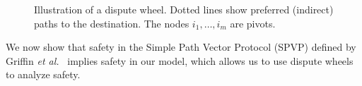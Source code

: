 \begin{figure}
\centering
\begin{psfrags}
%
%
\end{psfrags}
\caption[Illustration of a dispute wheel.]{Illustration of a dispute
  wheel.  Dotted lines show preferred 
  (indirect) paths to the destination.  The nodes $i_1, \ldots, i_m$
  are pivots.}
\label{fig:dw}
\end{figure}



We now show
  that safety in the Simple 
Path Vector Protocol (SPVP) defined by Griffin {\em et
al.}~\cite{Griffin2002c} implies safety in our model, which allows us to
  use dispute wheels to analyze safety. 



